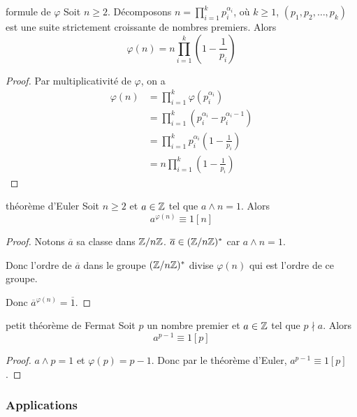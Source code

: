 \begin{theoreme}{formule de $\varphi$}{}
    Soit $n \geqslant 2$. Décomposons $\displaystyle n = \prod_{i = 1}^k p_i^{\alpha_i}$, où 
    $k \geqslant 1$, $(p_1, p_2, \ldots, p_k)$ est une suite strictement croissante de nombres premiers. 
    Alors $$\varphi(n) = n \prod_{i = 1}^k \left(1 - \frac 1 {p_i}\right)$$
\end{theoreme}

\begin{proof}
    Par multiplicativité de $\varphi$, on a
    \begin{align*}
        \varphi(n) & = \prod_{i = 1}^k \varphi(p_i^{\alpha_i}) \\
        & = \prod_{i = 1}^k \left(p_i^{\alpha_i} - p_i^{\alpha_i - 1}\right) \\
        & = \prod_{i = 1}^k p_i^{\alpha_i} \left( 1 - \frac 1 {p_i} \right) \\
        & = n \prod_{i = 1}^k \left(1 - \frac 1 {p_i}\right)
    \end{align*}
\end{proof}

\begin{theoreme}{théorème d'Euler}{}
    Soit $n \geqslant 2$ et $a \in \mathbb{Z}$ tel que $a \wedge n = 1$.
    Alors $$a^{\varphi(n)} \equiv 1 [n]$$
\end{theoreme}

\begin{proof}
    Notons $\overline a $ sa classe dans $\mathbb{Z}/n\mathbb{Z}$. $\overline a \in (\mathbb{Z}/n\mathbb{Z})^*$ car 
    $a \wedge n = 1$.

    Donc l'ordre de $\overline a$ dans le groupe $(\mathbb{Z}/n\mathbb{Z})^*$ divise $\varphi(n)$ qui 
    est l'ordre de ce groupe.

    Donc $\overline a^{\varphi(n)} = \overline 1$.
\end{proof}

\begin{corollaire}{petit théorème de Fermat}{}
    Soit $p$ un nombre premier et $a \in \mathbb{Z}$ tel que $p \nmid a$.
    Alors $$a^{p - 1} \equiv 1 [p]$$
\end{corollaire}

\begin{proof}
    $a \wedge p = 1$ et $\varphi(p) = p - 1$.
    Donc par le théorème d'Euler, $a^{p - 1} \equiv 1 [p]$.
\end{proof}

\subsubsection{Applications }

